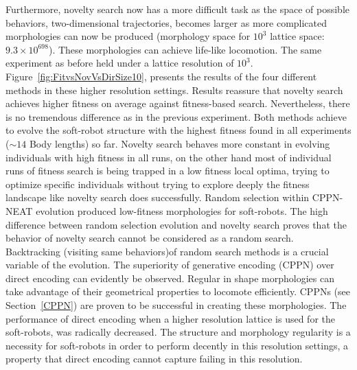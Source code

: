 Furthermore, novelty search now has a more difficult task as the space of possible behaviors, two-dimensional trajectories, becomes larger as more complicated morphologies can now be produced (morphology space for $10^3$ lattice space: $9.3 \times 10^{698}$). These morphologies can achieve life-like locomotion. The same experiment as before held under a lattice resolution of $10^3$. Figure~\ref{fig:FitvsNovVsDirSize10}, presents the results of the four different methods in these higher resolution settings. Results reassure that novelty search achieves higher fitness on average against fitness-based search. Nevertheless, there is no tremendous difference as in the previous experiment. Both methods achieve to evolve the soft-robot structure with the highest fitness found in all experiments ($\sim 14$ Body lengths) so far. Novelty search behaves more constant in evolving individuals with high fitness in all runs, on the other hand most of individual runs of fitness search is being trapped in a low fitness local optima, trying to optimize specific individuals without trying to explore deeply the fitness landscape like novelty search does successfully. Random selection within CPPN-NEAT evolution produced low-fitness morphologies for soft-robots. The high difference between random selection evolution and novelty search proves that the behavior of novelty search cannot be considered as a random search. Backtracking (visiting same behaviors)of random search methods is a crucial variable of the evolution. The superiority of generative encoding (CPPN) over direct encoding can evidently be observed. Regular in shape morphologies can take advantage of their geometrical properties to locomote efficiently. CPPNs (see Section~\ref{CPPN}) are proven to be successful in creating these morphologies. The performance of direct encoding when a higher resolution lattice is used for the soft-robots, was radically decreased. The structure and morphology regularity is a necessity for soft-robots in order to perform decently in this resolution settings, a property that direct encoding cannot capture failing in this resolution.

